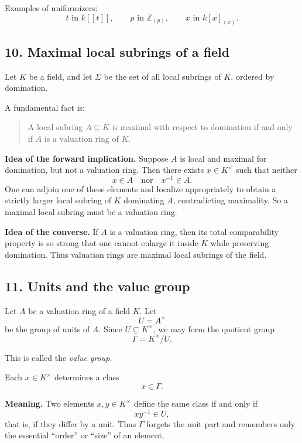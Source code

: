 \documentclass[12pt,a4paper]{article}
\theoremstyle{notespace}
\begin{document}
Examples of uniformizers:
\[
t \text{ in } k[[t]], \qquad p \text{ in } \mathbb Z_{(p)}, \qquad x \text{ in } k[x]_{(x)}.
\]

\subsection{10. Maximal local subrings of a field}

Let \(K\) be a field, and let \(\Sigma\) be the set of all local subrings of \(K\), ordered by domination.

A fundamental fact is:

\begin{quote}
	A local subring \(A\subseteq K\) is maximal with respect to domination if and only if \(A\) is a valuation ring of \(K\).
\end{quote}

\textbf{Idea of the forward implication.}
Suppose \(A\) is local and maximal for domination, but not a valuation ring. Then there exists \(x\in K^\times\) such that neither
\[
x\in A \quad \text{nor} \quad x^{-1}\in A.
\]
One can adjoin one of these elements and localize appropriately to obtain a strictly larger local subring of \(K\) dominating \(A\), contradicting maximality. So a maximal local subring must be a valuation ring.

\textbf{Idea of the converse.}
If \(A\) is a valuation ring, then its total comparability property is so strong that one cannot enlarge it inside \(K\) while preserving domination. Thus valuation rings are maximal local subrings of the field.

\subsection{11. Units and the value group}

Let \(A\) be a valuation ring of a field \(K\). Let
\[
U=A^\times
\]
be the group of units of \(A\). Since \(U\subseteq K^\times\), we may form the quotient group
\[
\Gamma = K^\times/U.
\]

This is called the \emph{value group}.

Each \(x\in K^\times\) determines a class
\[
\overline{x}\in \Gamma.
\]

\textbf{Meaning.}
Two elements \(x,y\in K^\times\) define the same class if and only if
\[
xy^{-1}\in U,
\]
that is, if they differ by a unit. Thus \(\Gamma\) forgets the unit part and remembers only the essential ``order'' or ``size'' of an element.
\end{document}

